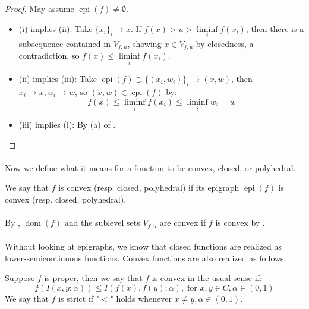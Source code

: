 \begin{proof}
	May assume $\operatorname{epi}(f)\neq\emptyset$.
	\begin{itemize}
		\item (i) implies (ii): Take $\{x_i\}_i\to x$. If $f(x)>u>\underset{i}{\operatorname{liminf}}f(x_i)$, then there is a subsequence contained in $V_{f,u}$, showing $x\in V_{f,u}$ by closedness, a contradiction, so $f(x)\leq \underset{i}{\operatorname{liminf}}f(x_i)$.
		\item (ii) implies (iii): Take $\operatorname{epi}(f)\supset\{(x_i,w_i)\}_i\to(x,w)$, then $x_i\to x,w_i\to w$, so $(x,w)\in \operatorname{epi}(f)$ by:
		      \[f(x)\leq\underset{i}{\operatorname{liminf}}f(x_i)\leq \underset{i}{\operatorname{liminf}}w_i=w\]
		\item  (iii) implies (i): By (a) of .\qedhere{}
	\end{itemize}
\end{proof}

\paragraph{}Now we define what it means for a function to be convex, closed, or polyhedral.

\begin{defn}
	\label{defn:021-convex-funcs}
	We say that $f$ is convex (resp. closed, polyhedral) if its epigraph $\operatorname{epi}(f)$ is convex (resp. closed, polyhedral).
\end{defn}

\paragraph{}By , $\operatorname{dom}(f)$ and the sublevel sets $V_{f,u}$ are convex if $f$ is convex by .
\paragraph{}Without looking at epigraphs, we know that closed functions are realized as lower-semicontinuous functions. Convex functions are also realized as follows.

\begin{defn}
	\label{defn:021-conv-usual}
	Suppose $f$ is proper, then we say that $f$ is convex in the usual sense if:
	\[
		f(I(x,y;\alpha))\leq
		I(f(x),f(y);\alpha),\;\text{for }x,y\in C,\alpha\in(0, 1)
	\]
	We say that $f$ is strict if "$<$" holds whenever $x\neq y,\alpha\in(0,1)$.
\end{defn}

